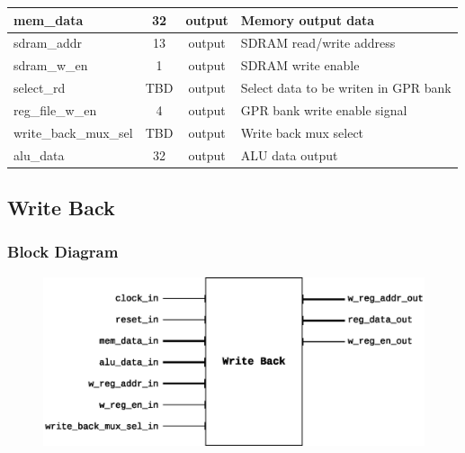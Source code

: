 \documentclass{article}
\begin{document}
\begin{center}
\begin{longtable}[pos]{| l | c | c | m{7cm} |}
        mem\_data           & 32  & output & Memory output data  \\ \hline
        sdram\_addr         & 13  & output & SDRAM read/write address  \\ \hline
        sdram\_w\_en        & 1   & output & SDRAM write enable  \\ \hline
        select\_rd          & TBD & output & Select data to be writen in GPR bank \\ \hline                     
        reg\_file\_w\_en      & 4   & output  & GPR bank write enable signal \\ \hline
        write\_back\_mux\_sel  & TBD & output  & Write back mux select  \\ \hline

        alu\_data           & 32  & output & ALU data output \\ \hline 
      \end{longtable}
    \end{center}  
  
  \newpage
  \subsection{Write Back}
  \subsubsection{Block Diagram}
  \begin{figure}[H]
    \centering
    \includegraphics[width=\linewidth]{pictures/blocks/wb_block.eps}
  \end{figure} 
\end{document}
